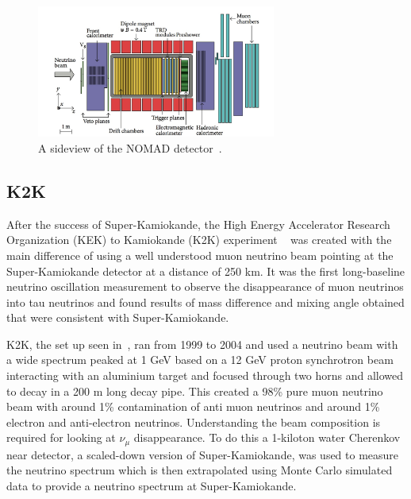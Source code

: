 \begin{figure}[h!]
\centering
  \centering
\includegraphics[width=0.7\textwidth]{figures/NOMAD2.jpeg}
\vspace{2mm}
\caption{A sideview of the NOMAD detector~\cite{69NOMAD}.}
\label{fig:NOMAD}
\end{figure}

\subsection{K2K}
After the success of Super-Kamiokande, the High Energy Accelerator Research Organization (KEK) to Kamiokande (K2K) experiment ~\cite{22K2K} was created with the main difference of using a well understood muon neutrino beam pointing at the Super-Kamiokande detector at a distance of 250 km. It was the first long-baseline neutrino oscillation measurement to observe the disappearance of muon neutrinos into tau neutrinos and found results of mass difference and mixing angle obtained that were consistent with Super-Kamiokande.

K2K, the set up seen in~, ran from 1999 to 2004 and used a neutrino beam with a wide spectrum peaked at 1 GeV based on a 12 GeV proton synchrotron beam interacting with an aluminium target and focused through two horns and allowed to decay in a 200 m long decay pipe. This created a 98\% pure muon neutrino beam with around 1\% contamination of anti muon neutrinos and around 1\% electron and anti-electron neutrinos. Understanding the beam composition is required for looking at $\nu_\mu$ disappearance. To do this a 1-kiloton water Cherenkov near detector,  a scaled-down version of Super-Kamiokande, was used to measure the neutrino spectrum which is then extrapolated using Monte Carlo simulated data to provide a neutrino spectrum at Super-Kamiokande.

